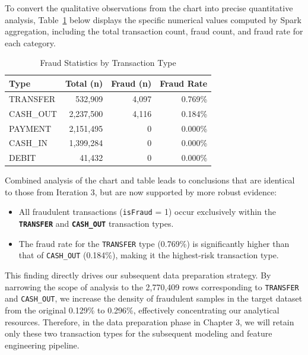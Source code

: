 \documentclass[sigplan,screen]{acmart}
\begin{document}
To convert the qualitative observations from the chart into precise quantitative analysis, Table~\ref{tab:fraud-by-type} below displays the specific numerical values computed by Spark aggregation, including the total transaction count, fraud count, and fraud rate for each category.

\begin{table}[h]
\caption{Fraud Statistics by Transaction Type}
\label{tab:fraud-by-type}
\centering
\begin{tabular}{|l|r|r|r|}
\hline
\textbf{Type} & \textbf{Total (n)} & \textbf{Fraud (n)} & \textbf{Fraud Rate} \\
\hline
TRANSFER & 532,909 & 4,097 & 0.769\% \\
\hline
CASH\_OUT & 2,237,500 & 4,116 & 0.184\% \\
\hline
PAYMENT & 2,151,495 & 0 & 0.000\% \\
\hline
CASH\_IN & 1,399,284 & 0 & 0.000\% \\
\hline
DEBIT & 41,432 & 0 & 0.000\% \\
\hline
\end{tabular}
\end{table}

Combined analysis of the chart and table leads to conclusions that are identical to those from Iteration 3, but are now supported by more robust evidence:

\begin{itemize}
\item All fraudulent transactions (\texttt{isFraud} = 1) occur exclusively within the \textbf{\texttt{TRANSFER}} and \textbf{\texttt{CASH\_OUT}} transaction types.
\item The fraud rate for the \texttt{TRANSFER} type (0.769\%) is significantly higher than that of \texttt{CASH\_OUT} (0.184\%), making it the highest-risk transaction type.
\end{itemize}

This finding directly drives our subsequent data preparation strategy. By narrowing the scope of analysis to the 2,770,409 rows corresponding to \texttt{TRANSFER} and \texttt{CASH\_OUT}, we increase the density of fraudulent samples in the target dataset from the original 0.129\% to 0.296\%, effectively concentrating our analytical resources. Therefore, in the data preparation phase in Chapter 3, we will retain only these two transaction types for the subsequent modeling and feature engineering pipeline.
\end{document}
